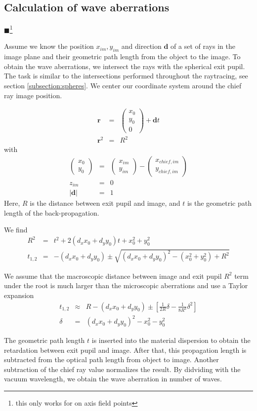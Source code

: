 \documentclass[12pt,a4paper,twoside,openright,BCOR10mm,headsepline,titlepage,abstracton,chapterprefix,final]{scrreprt}
\newcommand\Vector[1]{{\mathbf{#1}}}
\newcommand\Location{\Vector{r}}
\newcommand{\remark}[1]{{\color{red}$\blacksquare$}\footnote{{\color{red}#1}}}
\begin{document}
\subsection{Calculation of wave aberrations}
\remark{this only works for on axis field points}

Assume we know the position $x_{im}, y_{im}$ and direction $\Vector{d}$ of a set of rays in the image plane and their geometric path length from the object to the image.
To obtain the wave aberrations, we intersect the rays with the spherical exit pupil.
The task is similar to the intersections performed throughout the raytracing, see section \ref{subsection:spheres}.
We center our coordinate system around the chief ray image position.

\begin{eqnarray}
 \Location &=& \begin{pmatrix} x_0 \\ y_0 \\ 0 \end{pmatrix} + \Vector{d} t \\
 \Location^2 &=& R^2
\end{eqnarray}
with
 \begin{eqnarray}
 \begin{pmatrix} x_0 \\ y_0 \end{pmatrix} &=& \begin{pmatrix} x_{im} \\ y_{im} \end{pmatrix} - \begin{pmatrix} x_{chief,im} \\ y_{chief,im} \end{pmatrix} \\
 z_{im} &=& 0 \\
 | \Vector{d} | &=& 1
\end{eqnarray}
Here, $R$ is the distance between exit pupil and image, and $t$ is the geometric path length of the back-propagation.

We find
\begin{eqnarray}
 R^2 &=&  t^2 + 2 (d_x x_0 + d_y y_0) t + x_0^2 + y_0^2 \\
 t_{1,2} &=& - (d_x x_0 + d_y y_0) \pm \sqrt{ (d_x x_0 + d_y y_0)^2 - (x_0^2 + y_0^2) + R^2 }
\end{eqnarray}

We assume that the macroscopic distance between image and exit pupil $R^2$ term under the root is much larger than the microscopic aberrations and use a Taylor expansion
\begin{eqnarray}
 t_{1,2} &\approx& R - (d_x x_0 + d_y y_0) \pm 
 \left[ 
   \frac{1}{2R} \delta - \frac{1}{8R^3} \delta^2
 \right]
 \\
 \delta &=& (d_x x_0 + d_y y_0)^2 - x_0^2 - y_0^2
\end{eqnarray}

The geometric path length $t$ is inserted into the material dispersion to obtain the retardation between exit pupil and image. After that, this propagation length is subtracted from the optical path length from object to image.
Another subtraction of the chief ray value normalizes the result.
By didviding with the vacuum wavelength, we obtain the wave aberration in number of waves.
\end{document}
